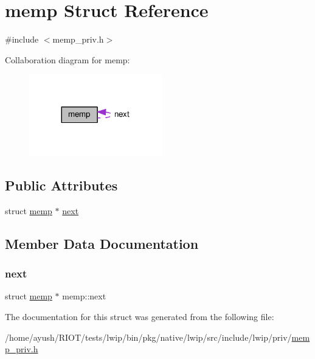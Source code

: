 \hypertarget{structmemp}{}\section{memp Struct Reference}
\label{structmemp}


{\ttfamily \#include $<$memp\+\_\+priv.\+h$>$}



Collaboration diagram for memp\+:
\nopagebreak
\begin{figure}[H]
\begin{center}
\leavevmode
\includegraphics[width=164pt]{structmemp__coll__graph}
\end{center}
\end{figure}
\subsection*{Public Attributes}
\begin{DoxyCompactItemize}
\item 
struct \hyperlink{structmemp}{memp} $\ast$ \hyperlink{structmemp_aeb71e069ce3c8a98a56a10e6d83fb261}{next}
\end{DoxyCompactItemize}


\subsection{Member Data Documentation}
\mbox{\label{structmemp_aeb71e069ce3c8a98a56a10e6d83fb261}} 
\subsubsection{\texorpdfstring{next}{next}}
{\footnotesize\ttfamily struct \hyperlink{structmemp}{memp} $\ast$ memp\+::next}



The documentation for this struct was generated from the following file\+:\begin{DoxyCompactItemize}
\item 
/home/ayush/\+R\+I\+O\+T/tests/lwip/bin/pkg/native/lwip/src/include/lwip/priv/\hyperlink{native_2lwip_2src_2include_2lwip_2priv_2memp__priv_8h}{memp\+\_\+priv.\+h}\end{DoxyCompactItemize}
